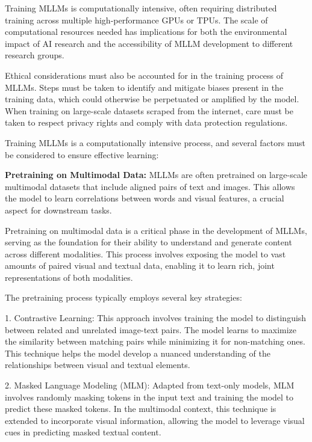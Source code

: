 Training MLLMs is computationally intensive, often requiring distributed training across multiple high-performance GPUs or TPUs. The scale of computational resources needed has implications for both the environmental impact of AI research and the accessibility of MLLM development to different research groups.

Ethical considerations must also be accounted for in the training process of MLLMs. Steps must be taken to identify and mitigate biases present in the training data, which could otherwise be perpetuated or amplified by the model. When training on large-scale datasets scraped from the internet, care must be taken to respect privacy rights and comply with data protection regulations.

Training MLLMs is a computationally intensive process, and several factors must be considered to ensure effective learning:

\textbf{Pretraining on Multimodal Data:} MLLMs are often pretrained on large-scale multimodal datasets that include aligned pairs of text and images. This allows the model to learn correlations between words and visual features, a crucial aspect for downstream tasks.

Pretraining on multimodal data is a critical phase in the development of MLLMs, serving as the foundation for their ability to understand and generate content across different modalities. This process involves exposing the model to vast amounts of paired visual and textual data, enabling it to learn rich, joint representations of both modalities.

The pretraining process typically employs several key strategies:

1. Contrastive Learning: This approach involves training the model to distinguish between related and unrelated image-text pairs. The model learns to maximize the similarity between matching pairs while minimizing it for non-matching ones. This technique helps the model develop a nuanced understanding of the relationships between visual and textual elements.

2. Masked Language Modeling (MLM): Adapted from text-only models, MLM involves randomly masking tokens in the input text and training the model to predict these masked tokens. In the multimodal context, this technique is extended to incorporate visual information, allowing the model to leverage visual cues in predicting masked textual content.

